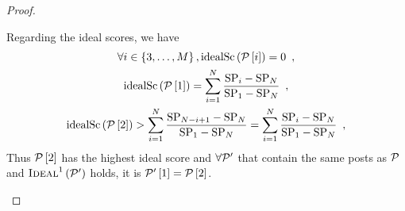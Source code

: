 \begin{proof}
\begin{itemize}
    Regarding the ideal scores, we have
    \begin{gather*}
      \forall i \in \left\{3, \dots, M\right\},
      \mathrm{idealSc}\left(\mathcal{P}\left[i\right]\right) = 0 \enspace, \\
      \mathrm{idealSc}\left(\mathcal{P}\left[1\right]\right) = \sum\limits_{i = 1}^N
      \frac{\mathrm{SP}_i - \mathrm{SP}_N}{\mathrm{SP}_1 - \mathrm{SP}_N}
      \enspace, \\
      \mathrm{idealSc}\left(\mathcal{P}\left[2\right]\right) > \sum\limits_{i = 1}^N
      \frac{\mathrm{SP}_{N - i + 1} - \mathrm{SP}_N}{\mathrm{SP}_1 -
      \mathrm{SP}_N} = \sum\limits_{i = 1}^N
      \frac{\mathrm{SP}_i - \mathrm{SP}_N}{\mathrm{SP}_1 - \mathrm{SP}_N}
      \enspace,
    \end{gather*}
    Thus $\mathcal{P}\left[2\right]$ has the highest ideal score and $\forall
    \mathcal{P}'$ that contain the same posts as $\mathcal{P}$ and
    $\textsc{Ideal}^1\left(\mathcal{P}'\right)$ holds, it is
    $\mathcal{P}'\left[1\right] = \mathcal{P}\left[2\right]$.


\end{itemize}
\end{proof}
